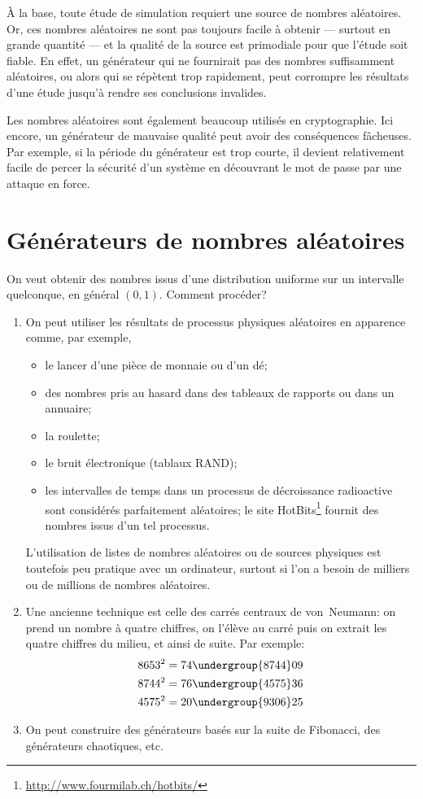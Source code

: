 À la base, toute étude de simulation requiert une source de nombres
aléatoires. Or, ces nombres aléatoires ne sont pas toujours facile à
obtenir --- surtout en grande quantité --- et la qualité de la source
est primodiale pour que l'étude soit fiable. En effet, un générateur
qui ne fournirait pas des nombres suffisamment aléatoires, ou alors
qui se répètent trop rapidement, peut corrompre les résultats d'une
étude jusqu'à rendre ses conclusions invalides.

Les nombres aléatoires sont également beaucoup utilisés en
cryptographie. Ici encore, un générateur de mauvaise qualité peut
avoir des conséquences fâcheuses. Par exemple, si la période du
générateur est trop courte, il devient relativement facile de percer
la sécurité d'un système en découvrant le mot de passe par une attaque
en force.


\section{Générateurs de nombres aléatoires}
\label{sec:generation:generateurs}

On veut obtenir des nombres issus d'une distribution uniforme sur un
intervalle quelconque, en général $(0, 1)$. Comment procéder?
\begin{enumerate}
\item On peut utiliser les résultats de processus physiques aléatoires
  en apparence comme, par exemple,
  \begin{itemize}
  \item le lancer d'une pièce de monnaie ou d'un dé;
  \item des nombres pris au hasard dans des tableaux de rapports ou
    dans un annuaire;
  \item la roulette;
  \item le bruit électronique (tablaux RAND);
  \item les intervalles de temps dans un processus de décroissance
    radioactive sont considérés parfaitement aléatoires; le site
    HotBits\footnote{%
      \url{http://www.fourmilab.ch/hotbits/}} %
    fournit des nombres issus d'un tel processus.
  \end{itemize}
  L'utilisation de listes de nombres aléatoires ou de sources
  physiques est toutefois peu pratique avec un ordinateur, surtout si
  l'on a besoin de milliers ou de millions de nombres aléatoires.
\item Une ancienne technique est celle des carrés centraux de
  von~Neumann: on prend un nombre à quatre chiffres, on l'élève au
  carré puis on extrait les quatre chiffres du milieu, et ainsi de
  suite. Par exemple:
  \begin{align*}
    8653^2 &= 74\undergroup{8744}09 \\
    8744^2 &= 76\undergroup{4575}36 \\
    4575^2 &= 20\undergroup{9306}25
  \end{align*}
\item On peut construire des générateurs basés sur la suite de
  Fibonacci, des générateurs chaotiques, etc.
\end{enumerate}

